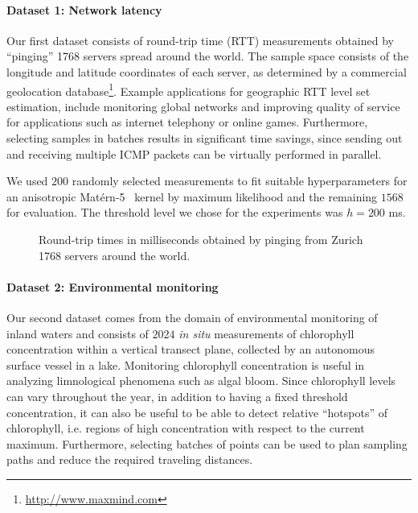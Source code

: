 \paragraph{Dataset 1: Network latency}
Our first dataset consists of round-trip time (RTT) measurements obtained
by ``pinging'' 1768 servers spread around the world.
The sample space consists of the longitude and latitude coordinates of each
server, as determined by a commercial geolocation
database\footnote{\url{http://www.maxmind.com}}.
Example applications for geographic RTT level set estimation, include
monitoring global networks and improving quality of service for applications
such as internet telephony or online games. Furthermore,
selecting samples in batches results in significant time savings, since
sending out and receiving multiple ICMP packets can be virtually performed in
parallel.

We used $200$ randomly selected measurements to fit suitable hyperparameters for
an anisotropic Mat\'{e}rn-5~\mbox{\cite{rasmussen06}} kernel by maximum
likelihood  and the remaining $1568$ for evaluation.
The threshold level we chose for the experiments was $h = 200$ ms.

%
\begin{figure}[tb]
  \centering
  \caption{Round-trip times in milliseconds obtained by pinging from Zurich
           1768 servers around the world.}
  \label{fig:map}
\end{figure}

\paragraph{Dataset 2: Environmental monitoring}
Our second dataset comes from the domain of environmental monitoring of inland
waters and consists of $2024$ \emph{in situ} measurements of chlorophyll
concentration within a vertical transect plane, collected by an autonomous
surface vessel in a lake.
Monitoring chlorophyll concentration is useful in analyzing limnological
phenomena such as algal bloom. Since chlorophyll levels can vary throughout
the year, in addition to having a fixed threshold concentration, 
it can also be useful to be able to detect
relative ``hotspots'' of chlorophyll, i.e. regions of high concentration
with respect to the current maximum. Furthermore, selecting batches of points
can be used to plan sampling paths and reduce the required traveling
distances.

